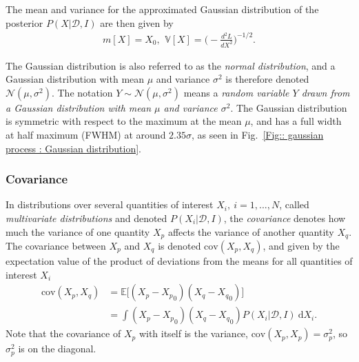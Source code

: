 \documentclass[twoside,english]{uiofysmaster}
\begin{document}
{{The mean and variance for the approximated Gaussian distribution of the posterior $P(X|\mathcal{D}, I)$ are then given by
\begin{align}
m[X] = X_0\text{, }~ \mathbb{V}[X] = \Big( - \frac{d^2L}{dX^2} \Big)^{-1/2}.
\end{align}

The Gaussian distribution is also referred to as the \textit{normal distribution}, and a Gaussian distribution with mean $\mu$ and variance $\sigma^2$ is therefore denoted $\mathcal{N}(\mu, \sigma^2)$. The notation $Y \sim \mathcal{N}(\mu, \sigma^2)$ means a \textit{random variable $Y$ drawn from a Gaussian distribution with mean $\mu$ and variance $\sigma^2$}. The Gaussian distribution is symmetric with respect to the maximum at the mean $\mu$, and has a full width at half maximum (FWHM) at around $2.35 \sigma$, as seen in Fig.~\ref{Fig:: gaussian process : Gaussian distribution}.  





\subsubsection{Covariance}\label{Sec:: gaussian process : Covariance}




In distributions over several quantities of interest $X_i,~i=1,...,N$, called \textit{multivariate distributions} and denoted $P(X_i| \mathcal{D}, I)$, the \textit{covariance} denotes how much the variance of one quantity $X_p$ affects the variance of another quantity $X_q$. The covariance between $X_p$ and $X_q$ is denoted $\mathrm{cov}(X_p, X_q)$, and given by the expectation value of the product of deviations from the means for all quantities of interest $X_i$ 
\begin{align}\label{Eq:: gaussian process : Covariance definition}
\mathrm{cov}(X_p, X_q) &= \mathbb{E} \big[(X_p - {X_p}_0) (X_q - {X_q}_0) \big] \nonumber \\&=\int (X_p - {X_p}_0) (X_q - {X_q}_0) P (X_i | \mathcal{D}, I) ~\text{d}X_i.
\end{align}
Note that the covariance of $X_p$ with itself is the variance, $\mathrm{cov}(X_p, X_p) = \sigma_p^2$, so $\sigma_p^2$ is on the diagonal.

}}
\end{document}
